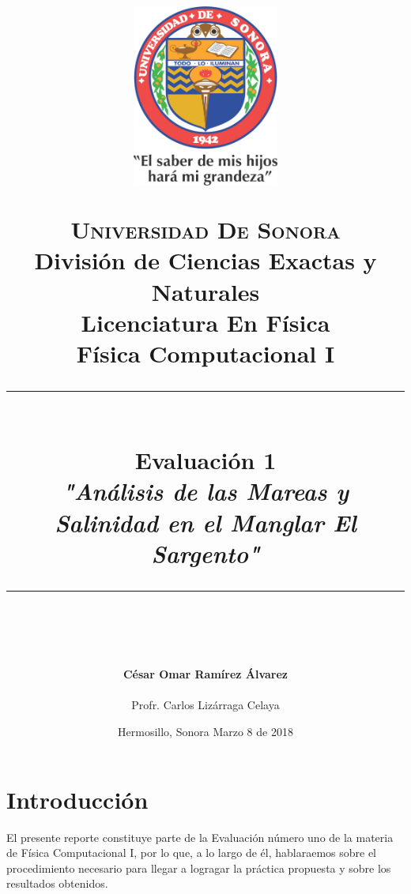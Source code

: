 \documentclass[12pt]{article}
\newcommand{\HRule}[1]{\rule{\linewidth}{#1}}
\begin{document}
\begin{titlepage}

\title{ \normalsize 
        \begin{center}
        \includegraphics[height=6cm]{Logo.jpg}
        \end{center}
        \LARGE \textsc{\textbf{Universidad De Sonora}} \\ \bigskip
		\Large División de Ciencias Exactas y Naturales \\
        Licenciatura En Física \\ \bigskip
        \bigskip
        Física Computacional I
		\\ [0.1cm]  
		\HRule{2pt} \\
		\Large \textbf{{Evaluación 1}} \\
        \textit{\textbf{"Análisis de las Mareas y Salinidad en el Manglar El Sargento"}}
		\HRule{2pt} \\
		\normalsize \vspace*{0.001\baselineskip}}
        
\date{\bigskip \Large Hermosillo, Sonora  \hspace*{\fill}  Marzo 8 de 2018}

        
\author{
		\Large\textbf{ César Omar Ramírez Álvarez} \\ \bigskip
        \\ \bigskip
       \Large Profr. Carlos Lizárraga Celaya}
       \end{titlepage}
       \maketitle
       
\newpage
\pagestyle{plain}
\section*{Introducción}
El presente reporte constituye parte de la Evaluación número uno de la materia de Física Computacional I, por lo que, a lo largo de él, hablaraemos sobre el procedimiento necesario para llegar a logragar la práctica propuesta y sobre los resultados obtenidos.\\
\end{document}
